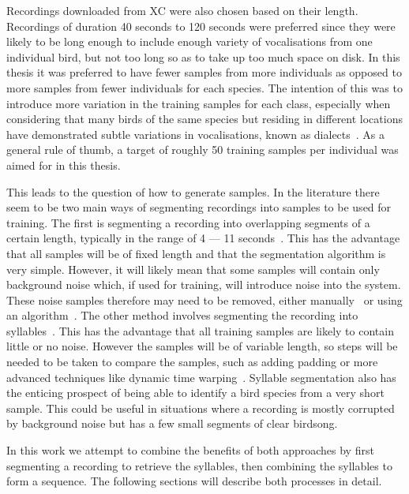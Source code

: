 Recordings downloaded from XC were also chosen based on their length. Recordings
of duration 40 seconds to 120 seconds were preferred since they were likely to
be long enough to include enough variety of vocalisations from one individual
bird, but not too long so as to take up too much space on disk. In this thesis
it was preferred to have fewer samples from more individuals as opposed to more
samples from fewer individuals for each species. The intention of this was to
introduce more variation in the training samples for each class, especially when
considering that many birds of the same species but residing in different
locations have demonstrated subtle variations in vocalisations, known as
dialects~\cite{baker1985biology}. As a general rule of thumb, a target of
roughly 50 training samples per individual was aimed for in this thesis.

This leads to the question of how to generate samples. In the literature there
seem to be two main ways of segmenting recordings into samples to be used for
training. The first is segmenting a recording into overlapping segments of a
certain length, typically in the range of 4 --- 11
seconds~\cite{yan2021birdsong,crous2019polyphonic}. This has the advantage that
all samples will be of fixed length and that the segmentation algorithm is very
simple. However, it will likely mean that some samples will contain only
background noise which, if used for training, will introduce noise into the
system. These noise samples therefore may need to be removed, either
manually~\cite{yan2021birdsong} or using an
algorithm~\cite{narasimhan2017simultaneous}. The other method involves
segmenting the recording into
syllables~\cite{fagerlund2007bird,ramashini2022robust}. This has the advantage
that all training samples are likely to contain little or no noise. However the
samples will be of variable length, so steps will be needed to be taken 
to compare the samples, such as adding padding or more advanced techniques like
dynamic time warping~\cite{somervuo2006parametric}. Syllable segmentation also
has the enticing prospect of being able to identify a bird species from a very
short sample. This could be useful in situations where a recording is mostly
corrupted by background noise but has a few small segments of clear birdsong.

In this work we attempt to combine the benefits of both approaches by first
segmenting a recording to retrieve the syllables, then combining the syllables
to form a sequence. The following sections will describe both processes in
detail.

